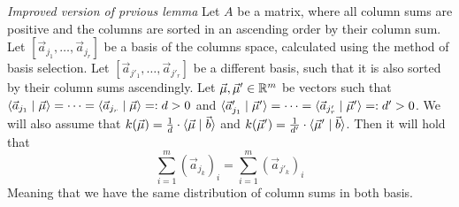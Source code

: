 \begin{lemma}
    \textit{Improved version of prvious lemma} Let $A$ be a matrix, where all column sums are positive and the columns are sorted in an ascending order by their column sum. Let $[\vec a_{j_1}, \dots, \vec a_{j_r}]$ be a basis of the columns space, calculated using the method of basis selection. Let $[\vec a_{j'_1}, \dots, \vec a_{j'_r}]$ be a different basis, such that it is also sorted by their column sums ascendingly. Let $\vec\mu, \vec\mu' \in \mathbb{R}^m$ be vectors such that $\langle \vec a_{j_1} \mid \vec\mu \rangle = \dots = \langle \vec a_{j_r} \mid \vec\mu \rangle =: d > 0$ and $\langle \vec a'_{j_1} \mid \vec\mu' \rangle = \dots = \langle \vec a_{j'_r} \mid \vec\mu' \rangle =: d' > 0$. We will also assume that $k(\vec \mu) = \frac{1}{d}\cdot\langle \vec{\mu} \mid \vec b \rangle$ and $k(\vec \mu') = \frac{1}{d'}\cdot\langle \vec{\mu}' \mid \vec b \rangle$. Then it will hold that
    $$\sum_{i=1}^{m}(\vec a_{j_k})_i = \sum_{i=1}^{m}(\vec a_{j'_k})_i$$
    Meaning that we have the same distribution of column sums in both basis.
\end{lemma}
